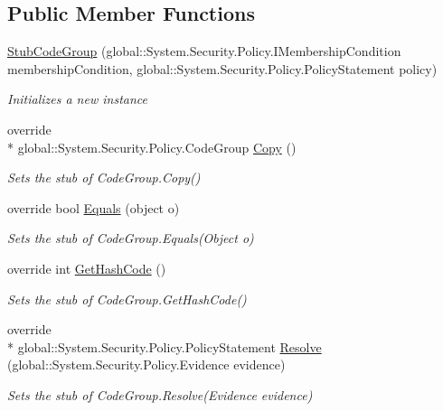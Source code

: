 \subsection*{Public Member Functions}
\begin{DoxyCompactItemize}
\item 
\hyperlink{class_system_1_1_security_1_1_policy_1_1_fakes_1_1_stub_code_group_a39d7f1fcd5d8e7ac7ccc58b3ac5e256f}{Stub\-Code\-Group} (global\-::\-System.\-Security.\-Policy.\-I\-Membership\-Condition membership\-Condition, global\-::\-System.\-Security.\-Policy.\-Policy\-Statement policy)
\begin{DoxyCompactList}\small\item\em Initializes a new instance\end{DoxyCompactList}\item 
override \\*
global\-::\-System.\-Security.\-Policy.\-Code\-Group \hyperlink{class_system_1_1_security_1_1_policy_1_1_fakes_1_1_stub_code_group_acf308f53feb5fa281f7928815923d133}{Copy} ()
\begin{DoxyCompactList}\small\item\em Sets the stub of Code\-Group.\-Copy()\end{DoxyCompactList}\item 
override bool \hyperlink{class_system_1_1_security_1_1_policy_1_1_fakes_1_1_stub_code_group_a4d7af6fccbad41c579614a5f9d00fa08}{Equals} (object o)
\begin{DoxyCompactList}\small\item\em Sets the stub of Code\-Group.\-Equals(\-Object o)\end{DoxyCompactList}\item 
override int \hyperlink{class_system_1_1_security_1_1_policy_1_1_fakes_1_1_stub_code_group_a3434d15edfd621823946e57f2124b17c}{Get\-Hash\-Code} ()
\begin{DoxyCompactList}\small\item\em Sets the stub of Code\-Group.\-Get\-Hash\-Code()\end{DoxyCompactList}\item 
override \\*
global\-::\-System.\-Security.\-Policy.\-Policy\-Statement \hyperlink{class_system_1_1_security_1_1_policy_1_1_fakes_1_1_stub_code_group_a38a1e75c72c8c8cc2a14bc3e8cbd6986}{Resolve} (global\-::\-System.\-Security.\-Policy.\-Evidence evidence)
\begin{DoxyCompactList}\small\item\em Sets the stub of Code\-Group.\-Resolve(\-Evidence evidence)\end{DoxyCompactList}\item 

\end{DoxyCompactItemize}
